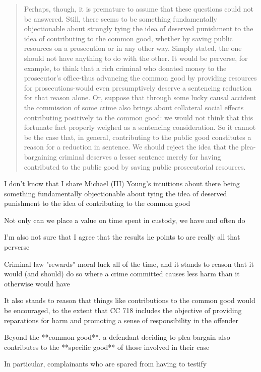 \begin{quote}
    Perhaps, though, it is premature to assume that these questions could not be answered. Still, there seems to be something fundamentally objectionable about strongly tying the idea of deserved punishment to the idea of contributing to the common good, whether by saving public resources on a prosecution or in any other way. Simply stated, the one should not have anything to do with the other. It would be perverse, for example, to think that a rich criminal who donated money to the prosecutor's office-thus advancing the common good by providing resources for prosecutions-would even presumptively deserve a sentencing reduction for that reason alone. Or, suppose that through some lucky causal accident the commission of some crime also brings about collateral social effects contributing positively to the common good: we would not think that this fortunate fact properly weighed as a sentencing consideration. So it cannot be the case that, in general, contributing to the public good constitutes a reason for a reduction in sentence. We should reject the idea that the plea-bargaining criminal deserves a lesser sentence merely for having contributed to the public good by saving public prosecutorial resources.
\end{quote}

I don't know that I share Michael (III) Young's intuitions about there being something fundamentally objectionable about tying the idea of deserved punishment to the idea of contributing to the common good

Not only can we place a value on time spent in custody, we have and often do

I'm also not sure that I agree that the results he points to are really all that perverse

Criminal law "rewards" moral luck all of the time, and it stands to reason that it would (and should) do so where a crime committed causes less harm than it otherwise would have

It also stands to reason that things like contributions to the common good would be encouraged, to the extent that CC 718 includes the objective of providing reparations for harm and promoting a sense of responsibility in the offender

Beyond the **common good**, a defendant deciding to plea bargain also contributes to the **specific good** of those involved in their case

In particular, complainants who are spared from having to testify

